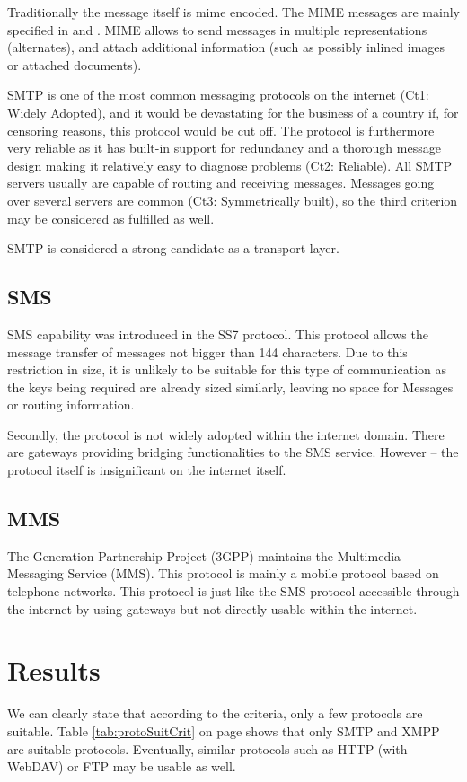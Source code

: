 \documentclass[a4paper,appendixprefix,pdfusetitle,twocolumn,fontsize=8pt,draft,DIV=calc,8pt]{\doctype} %
\begin{document}
Traditionally the message itself is mime encoded. The MIME messages are mainly specified in \cite{RFC2045} and \cite{RFC2046}. MIME allows to send messages in multiple representations (alternates), and attach additional information (such as possibly inlined images or attached documents). 

SMTP is one of the most common messaging protocols on the internet (Ct1: Widely Adopted), and it would be devastating for the business of a country if, for censoring reasons, this protocol would be cut off. The protocol is furthermore very reliable as it has built-in support for redundancy and a thorough message design making it relatively easy to diagnose problems (Ct2: Reliable). All SMTP servers usually are capable of routing and receiving messages. Messages going over several servers are common (Ct3: Symmetrically built), so the third criterion may be considered as fulfilled as well.

SMTP is considered a strong candidate as a transport layer.  

\subsection{SMS}
SMS capability was introduced in the SS7 protocol. This protocol allows the message transfer of messages not bigger than 144 characters. Due to this restriction in size, it is unlikely to be suitable for this type of communication as the keys being required are already sized similarly, leaving no space for Messages or routing information.

Secondly, the protocol is not widely adopted within the internet domain. There are gateways providing bridging functionalities to the SMS service. However -- the protocol itself is insignificant on the internet itself. 

\subsection{MMS}
The  Generation Partnership Project (3GPP) maintains the Multimedia Messaging Service (MMS). This protocol is mainly a mobile protocol based on telephone networks. This protocol is just like the SMS protocol accessible through the internet by using gateways but not directly usable within the internet.

\section{Results}
We can clearly state that according to the criteria, only a few protocols are suitable. Table \ref{tab:protoSuitCrit} on page \pageref{tab:protoSuitCrit} shows that only SMTP and XMPP are suitable protocols. Eventually, similar protocols such as HTTP (with WebDAV) or FTP may be usable as well. 
\end{document}
